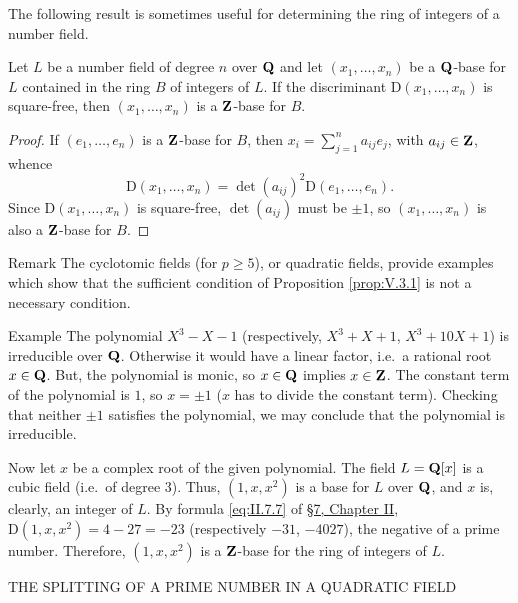 The following result is sometimes useful for determining the ring of
integers of a number field.

\begin{proposition}
\label{prop:V.3.1}
Let $L$ be a number field of degree $n$ over $\mathbf{Q}$ and let
$(x_{1},\ldots,x_{n})$ be a $\mathbf{Q}$-base for $L$ contained in the ring $B$ of
integers of $L$. If the discriminant $\mathrm{D}(x_{1},\ldots,x_{n})$ is
square-free, then $(x_{1},\ldots,x_{n})$ is a $\mathbf{Z}$-base for $B$.
\end{proposition}

\begin{proof}
If $(e_{1},\ldots,e_{n})$ is a $\mathbf{Z}$-base for $B$, then
$x_{i}=\sum_{j=1}^{n}a_{ij}e_{j}$, with $a_{ij}\in\mathbf{Z}$, whence
\[
\mathrm{D}(x_{1},\ldots,x_{n})
=\det(a_{ij})^{2}\mathrm{D}(e_{1},\ldots,e_{n}).
\]
Since $\mathrm{D}(x_{1},\ldots,x_{n})$ is square-free, $\det(a_{ij})$ must
be $\pm1$, so $(x_{1},\ldots,x_{n})$ is also a $\mathbf{Z}$-base for $B$.
\end{proof}

\begin{statement}{Remark}
The cyclotomic fields (for $p\geq5$), or quadratic fields, provide examples
which show that the sufficient condition of Proposition \ref{prop:V.3.1} is
not a necessary condition.
\end{statement}

\begin{statement}{Example}
The polynomial $X^{3}-X-1$ (respectively, $X^{3}+X+1$, $X^{3}+10X+1$) is
irreducible over $\mathbf{Q}$. Otherwise it would have a linear factor, i.e.\ a
rational root $x\in\mathbf{Q}$. But, the polynomial is monic, so $x\in\mathbf{Q}$ implies
$x\in\mathbf{Z}$. The constant term of the polynomial is $1$, so $x=\pm1$ ($x$ has
to divide the constant term). Checking that neither $\pm1$ satisfies the
polynomial, we may conclude that the polynomial is irreducible.

Now let $x$ be a complex root of the given polynomial. The field
$L=\mathbf{Q}[x]$ is a cubic field (i.e.\ of degree $3$). Thus, $(1,x,x^{2})$ is a
base for $L$ over $\mathbf{Q}$, and $x$ is, clearly, an integer of $L$. By formula
\eqref{eq:II.7.7} of \hyperref[sec:2.7]{§7, Chapter II},
$\mathrm{D}(1,x,x^{2})=4-27=-23$ (respectively $-31$, $-4027$), the
negative of a prime number. Therefore, $(1,x,x^{2})$ is a $\mathbf{Z}$-base for the
ring of integers of $L$.
\end{statement}

%
        {THE SPLITTING OF A PRIME NUMBER IN A QUADRATIC FIELD}


